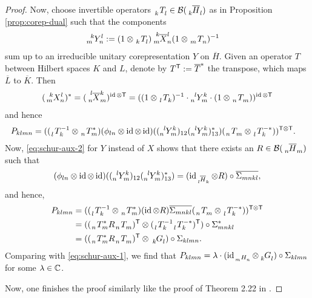 \begin{proof}
  Now, choose  invertible operators $\Grd{T}{k}{l} \in
  \mathcal{B}(\Grd{\overline{H}}{k}{l})$ as in Proposition \ref{prop:corep-dual} such that the components
  \begin{align*}
    \Gr{Y}{k}{l}{m}{n} &:= (1 \otimes \Grd{T}{k}{l}) \Gr{\overline{X}}{k}{l}{m}{n} (1 \otimes
    \Grd{T}{m}{n})^{-1} 
  \end{align*}
  sum up to an irreducible unitary corepresentation $Y$ on $\overline{H}$. 
  Given an operator $T$ between Hilbert spaces $K$ and $L$,  denote by
  $T^{\mathsf{T}}:=\overline{T}^{*}$ the transpose, which maps $\overline{L}$ to
  $\overline{K}$. Then
  \begin{align*}
    (\Gr{X}{k}{l}{m}{n})^{*}  = (\Gr{\overline{X}}{l}{k}{n}{m})^{\id \otimes \transpose} =
    ((1 \otimes \Grd{T}{l}{k})^{-1}\cdot \Gr{Y}{l}{k}{n}{m} \cdot (1\otimes \Grd{T}{n}{m}))^{\id \otimes \transpose}
  \end{align*}
  and hence
  \begin{align*}
    P_{klmn} &= ((\Gr{T}{}{-1}{l}{k} \otimes \Gr{T}{}{*}{n}{m})(\phi_{ln} \otimes \id \otimes
    \id)((\Gr{Y}{l}{k}{n}{m})_{12}(\Gr{Y}{l}{k}{n}{m})^{*}_{13})(\Grd{T}{n}{m} \otimes \Gr{T}{}{-*}{l}{k}))^{\transpose\otimes \transpose}.
  \end{align*}
  Now, \eqref{eq:schur-aux-2} for $Y$ instead of $X$ shows that there exists an $R\in
  \mathcal{B}(\Grd{\overline{H}}{n}{m})$ such that 
  \begin{align*}
    (\phi_{ln} \otimes \id \otimes
    \id)((\Gr{Y}{l}{k}{n}{m})_{12}(\Gr{Y}{l}{k}{n}{m})^{*}_{13}) = (\id_{\Grd{\overline{H}}{l}{k}}
    \otimes R)\circ \overline{\Sigma_{mnkl}},
  \end{align*}
  and hence,
  \begin{align*}
    P_{klmn} &= ((\Gr{T}{}{-1}{l}{k} \otimes \Gr{T}{}{*}{n}{m})(\id \otimes
    R)\overline{\Sigma_{mnkl}} (\Grd{T}{n}{m} \otimes \Gr{T}{}{-*}{l}{k}))^{\transpose\otimes
      \transpose} \\
    &= ((\Gr{T}{}{*}{n}{m}R \Grd{T}{n}{m})^{\transpose} \otimes
    (\Gr{T}{}{-1}{l}{k}\Gr{T}{}{-*}{l}{k})^{\transpose})\circ \Sigma_{mnkl}^{*} \\
    &=  ((\Gr{T}{}{*}{n}{m}R \Grd{T}{n}{m})^{\transpose} \otimes \Grd{G}{k}{l}) \circ \Sigma_{klmn}.
  \end{align*}
  Comparing with \eqref{eq:schur-aux-1}, we find that 
  $P_{klmn} = \lambda \cdot (\id_{\Grd{H}{m}{n}} \otimes \Grd{G}{k}{l}) \circ \Sigma_{klmn}$
  for some $\lambda \in \mathbb{C}$.
  
  Now, one finishes the proof similarly like the proof of Theorem 2.22 in \cite{}.
\end{proof}

